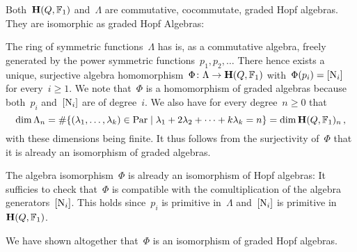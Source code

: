 \documentclass[a4paper,11pt]{scrartcl}
\begin{document}
Both~$\mathbf{H}(Q, \mathbb{F}_1)$ and~$\Lambda$ are commutative, cocommutate, graded Hopf algebras.
They are isomorphic as graded Hopf Algebras:

The ring of symmetric functions~$\Lambda$ has is, as a commutative algebra, freely generated by the power symmetric functions~$p_1, p_2, \dotsc$
There hence exists a unique, surjective algebra homomorphism~$\Phi \colon \Lambda \to \mathbf{H}(Q, \mathbb{F}_1)$ with~$\Phi(p_i) = [\mathrm{N}_i]$ for every~$i \geq 1$.
We note that~$\Phi$ is a homomorphism of graded algebras because both~$p_i$ and~$[ \mathrm{N}_i ]$ are of degree~$i$.
We also have for every degree~$n \geq 0$ that
\[
  \dim \Lambda_n
  =
  \counting
  \{
    (\lambda_1, \dotsc, \lambda_k) \in \Par
  \suchthat
    \lambda_1 + 2 \lambda_2 + \dotsb + k \lambda_k = n
  \}
  =
  \dim \Hall(Q, \Finite_1)_n \,,
\]
with these dimensions being finite.
It thus follows from the surjectivity of~$\Phi$ that it is already an isomorphism of graded algebras.

The algebra isomorphism~$\Phi$ is already an isomorphism of Hopf algebras:
It sufficies to check that~$\Phi$ is compatible with the comultiplication of the algebra generators~$[ \mathrm{N}_i ]$.
This holds since~$p_i$ is primitive in~$\Lambda$ and~$[ \mathrm{N}_i ]$ is primitive in~$\mathbf{H}(Q, \mathbb{F}_1)$.

We have shown altogether that~$\Phi$ is an isomorphism of graded Hopf algebras.
















\printbibliography
\end{document}
